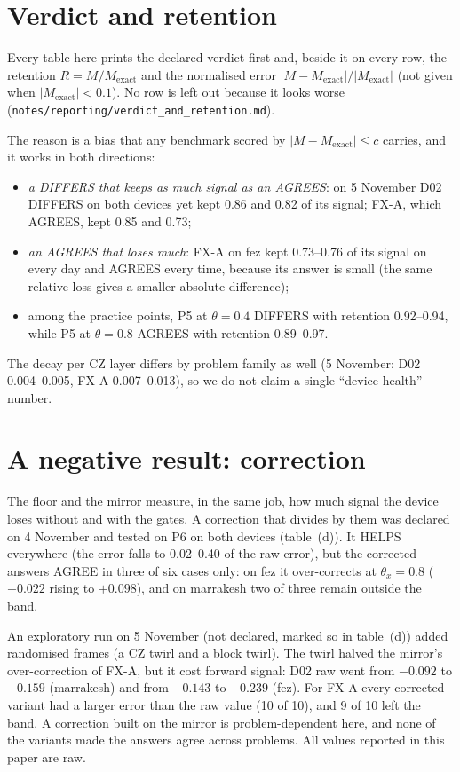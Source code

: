 \documentclass[10pt,a4paper]{article}
\begin{document}
\section{Verdict and retention}\label{sec:retention}
Every table here prints the declared verdict first and, beside it on every row, the retention $R = M/M_\mathrm{exact}$
and the normalised error $|M - M_\mathrm{exact}|/|M_\mathrm{exact}|$ (not given when $|M_\mathrm{exact}| < 0.1$). No
row is left out because it looks worse (\texttt{notes/reporting/verdict\_and\_retention.md}).

The reason is a bias that any benchmark scored by $|M - M_\mathrm{exact}| \le c$ carries, and it works in both
directions:
\begin{itemize}
\item \emph{a DIFFERS that keeps as much signal as an AGREES}: on 5 November D02 DIFFERS on both devices yet kept
0.86 and 0.82 of its signal; FX-A, which AGREES, kept 0.85 and 0.73;
\item \emph{an AGREES that loses much}: FX-A on fez kept 0.73--0.76 of its signal on every day and AGREES every
time, because its answer is small (the same relative loss gives a smaller absolute difference);
\item among the practice points, P5 at $\theta = 0.4$ DIFFERS with retention 0.92--0.94, while P5 at $\theta = 0.8$
AGREES with retention 0.89--0.97.
\end{itemize}
The decay per CZ layer differs by problem family as well (5 November: D02 0.004--0.005, FX-A 0.007--0.013), so we
do not claim a single ``device health'' number.

\section{A negative result: correction}\label{sec:correction}
The floor and the mirror measure, in the same job, how much signal the device loses without and with the gates. A
correction that divides by them was declared on 4 November and tested on P6 on both devices (table~(d)). It HELPS
everywhere (the error falls to 0.02--0.40 of the raw error), but the corrected answers AGREE in three of six cases
only: on fez it over-corrects at $\theta_x = 0.8$ ($+0.022$ rising to $+0.098$), and on marrakesh two of three remain
outside the band.

An exploratory run on 5 November (not declared, marked so in table~(d)) added randomised frames (a CZ twirl and a
block twirl). The twirl halved the mirror's over-correction of FX-A, but it cost forward signal: D02 raw went from
$-0.092$ to $-0.159$ (marrakesh) and from $-0.143$ to $-0.239$ (fez). For FX-A every corrected variant had a larger
error than the raw value (10 of 10), and 9 of 10 left the band. A correction built on the mirror is problem-dependent
here, and none of the variants made the answers agree across problems. All values reported in this paper are raw.
\end{document}
